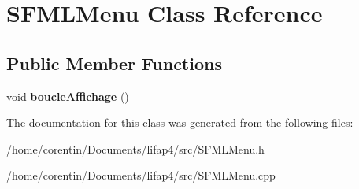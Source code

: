\hypertarget{class_s_f_m_l_menu}{}\section{S\+F\+M\+L\+Menu Class Reference}
\label{class_s_f_m_l_menu}
\subsection*{Public Member Functions}
\begin{DoxyCompactItemize}
\item 
\mbox{\label{class_s_f_m_l_menu_ab7eeb1a042f076ec28ce301c1d8d3660}} 
void {\bfseries boucle\+Affichage} ()
\end{DoxyCompactItemize}


The documentation for this class was generated from the following files\+:\begin{DoxyCompactItemize}
\item 
/home/corentin/\+Documents/lifap4/src/S\+F\+M\+L\+Menu.\+h\item 
/home/corentin/\+Documents/lifap4/src/S\+F\+M\+L\+Menu.\+cpp\end{DoxyCompactItemize}
